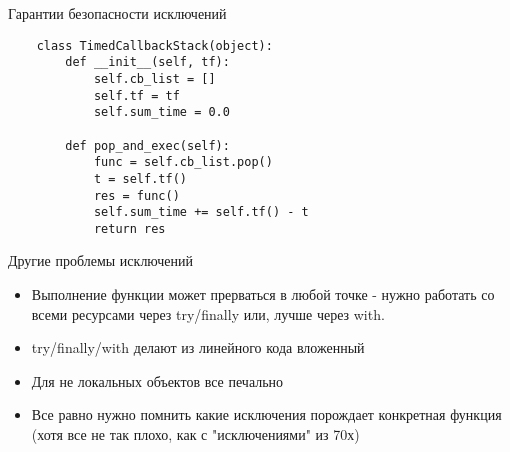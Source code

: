 \documentclass{article}
\begin{document}
\begin{center} Гарантии безопасности исключений \end{center}
\begin{lstlisting}
	class TimedCallbackStack(object):
		def __init__(self, tf):
			self.cb_list = []
			self.tf = tf
			self.sum_time = 0.0

		def pop_and_exec(self):
			func = self.cb_list.pop()
			t = self.tf()
			res = func()
			self.sum_time += self.tf() - t
			return res
\end{lstlisting}

\begin{center} Другие проблемы исключений \end{center}
\begin{itemize}
	\item Выполнение функции может прерваться в любой точке - нужно работать со всеми ресурсами
	      через try/finally или, лучше через with.
	\item try/finally/with делают из линейного кода вложенный
	\item Для не локальных объектов все печально
	\item Все равно нужно помнить какие исключения порождает конкретная функция
	      (хотя все не так плохо, как с "исключениями" из 70х)
\end{itemize}
\newpage

\end{document}
